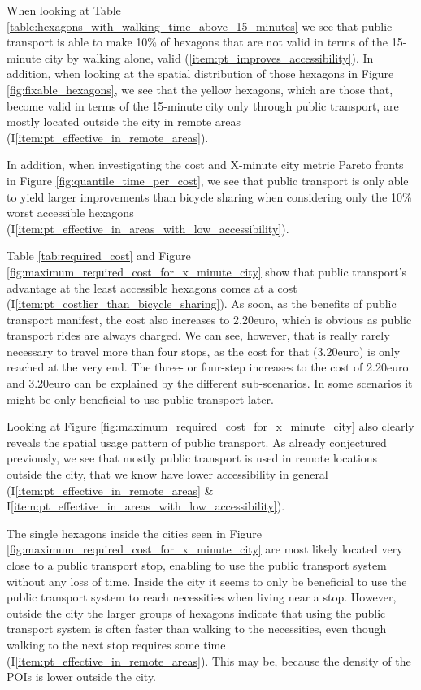 When looking at Table \ref{table:hexagons_with_walking_time_above_15_minutes} we see that public transport is able to make 10\% of hexagons that are not valid in terms of the 15-minute city by walking alone, valid (\ref{item:pt_improves_accessibility}).
In addition, when looking at the spatial distribution of those hexagons in Figure \ref{fig:fixable_hexagons}, we see that the yellow hexagons, which are those that, become valid in terms of the 15-minute city only through public transport, are mostly located outside the city in remote areas (I\ref{item:pt_effective_in_remote_areas}).

In addition, when investigating the cost and X-minute city metric Pareto fronts in Figure \ref{fig:quantile_time_per_cost}, we see that public transport is only able to yield larger improvements than bicycle sharing when considering only the 10\% worst accessible hexagons (I\ref{item:pt_effective_in_areas_with_low_accessibility}).

Table \ref{tab:required_cost} and Figure \ref{fig:maximum_required_cost_for_x_minute_city} show that public transport's advantage at the least accessible hexagons comes at a cost (I\ref{item:pt_costlier_than_bicycle_sharing}).
As soon, as the benefits of public transport manifest, the cost also increases to 2.20euro, which is obvious as public transport rides are always charged.
We can see, however, that is really rarely necessary to travel more than four stops, as the cost for that (3.20euro) is only reached at the very end. 
The three- or four-step increases to the cost of 2.20euro and 3.20euro can be explained by the different sub-scenarios.
In some scenarios it might be only beneficial to use public transport later.

Looking at Figure \ref{fig:maximum_required_cost_for_x_minute_city} also clearly reveals the spatial usage pattern of public transport.
As already conjectured previously, we see that mostly public transport is used in remote locations outside the city, that we know have lower accessibility in general (I\ref{item:pt_effective_in_remote_areas} \& I\ref{item:pt_effective_in_areas_with_low_accessibility}).

The single hexagons inside the cities seen in Figure \ref{fig:maximum_required_cost_for_x_minute_city} are most likely located very close to a public transport stop, enabling to use the public transport system without any loss of time.
Inside the city it seems to only be beneficial to use the public transport system to reach necessities when living near a stop.
However, outside the city the larger groups of hexagons indicate that using the public transport system is often faster than walking to the necessities, even though walking to the next stop requires some time (I\ref{item:pt_effective_in_remote_areas}).
This may be, because the density of the POIs is lower outside the city.

